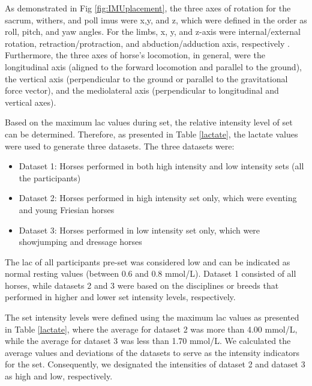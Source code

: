 As demonstrated in Fig \ref{fig:IMUplacement}, the three axes of rotation for the sacrum, withers, and poll \gls{imu}s were x,y, and z, which were defined in the order as roll, pitch, and yaw angles. For the limbs, x, y, and z-axis were internal/external rotation, retraction/protraction, and abduction/adduction axis, respectively \cite{456}. Furthermore, the three axes of horse's locomotion, in general, were the longitudinal axis (aligned to the forward locomotion and parallel to the ground), the vertical axis (perpendicular to the ground or parallel to the gravitational force vector), and the mediolateral axis (perpendicular to longitudinal and vertical axes).


Based on the maximum \gls{lac} values during \gls{set}, the relative intensity level of \gls{set} can be determined. Therefore, as presented in Table \ref{lactate}, the lactate values were used to generate three datasets. The three datasets were: 

\begin{itemize}
\item Dataset 1: Horses performed in both high intensity and low intensity \gls{set}s (all the participants)
\item Dataset 2: Horses performed in high intensity \gls{set} only, which were eventing and young Friesian horses
\item Dataset 3: Horses performed in low intensity \gls{set} only, which were showjumping and dressage horses
\end{itemize} 



The \gls{lac} of all participants pre-\gls{set} was considered low and can be indicated as normal resting values (between 0.6 and 0.8 \gls{mmol/L}). Dataset 1 consisted of all horses, while datasets 2 and 3 were based on the disciplines or breeds that performed in higher and lower \gls{set} intensity levels, respectively. 

The \gls{set} intensity levels were defined using the maximum \gls{lac} values as presented in Table \ref{lactate}, where the average for dataset 2 was more than 4.00 \gls{mmol/L}, while the average for dataset 3 was less than 1.70 \gls{mmol/L}. We calculated the average values and deviations of the datasets to serve as the intensity indicators for the \gls{set}. Consequently, we designated the intensities of dataset 2 and dataset 3 as high and low, respectively.


